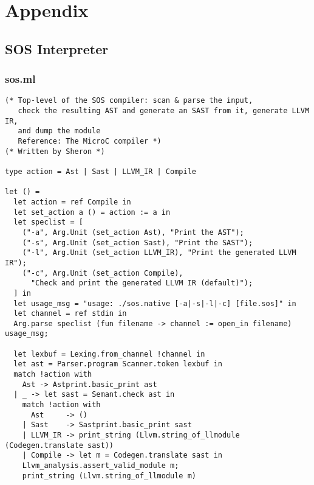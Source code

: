\documentclass[main.tex]{subfiles}
\begin{document}
	\section{Appendix}

\subsection{SOS Interpreter}	

\subsubsection{sos.ml}

\begin{lstlisting}
(* Top-level of the SOS compiler: scan & parse the input,
   check the resulting AST and generate an SAST from it, generate LLVM IR,
   and dump the module 
   Reference: The MicroC compiler *)
(* Written by Sheron *)
 
type action = Ast | Sast | LLVM_IR | Compile

let () =
  let action = ref Compile in
  let set_action a () = action := a in
  let speclist = [
    ("-a", Arg.Unit (set_action Ast), "Print the AST");
    ("-s", Arg.Unit (set_action Sast), "Print the SAST");
    ("-l", Arg.Unit (set_action LLVM_IR), "Print the generated LLVM IR");
    ("-c", Arg.Unit (set_action Compile),
      "Check and print the generated LLVM IR (default)");
  ] in  
  let usage_msg = "usage: ./sos.native [-a|-s|-l|-c] [file.sos]" in
  let channel = ref stdin in
  Arg.parse speclist (fun filename -> channel := open_in filename) usage_msg;
  
  let lexbuf = Lexing.from_channel !channel in
  let ast = Parser.program Scanner.token lexbuf in  
  match !action with
    Ast -> Astprint.basic_print ast
  | _ -> let sast = Semant.check ast in
    match !action with
      Ast     -> ()
    | Sast    -> Sastprint.basic_print sast
    | LLVM_IR -> print_string (Llvm.string_of_llmodule (Codegen.translate sast))
    | Compile -> let m = Codegen.translate sast in
	Llvm_analysis.assert_valid_module m;
	print_string (Llvm.string_of_llmodule m)
\end{lstlisting}
\end{document}
